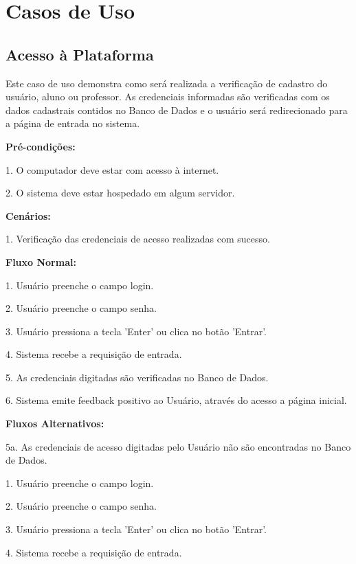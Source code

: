 \documentclass[graduacao,brazil]{ThesisPUC}
\begin{document}

\section{Casos de Uso}

\subsection{Acesso \`{a} Plataforma}

Este caso de uso demonstra como ser\'{a} realizada a verifica\c{c}\~{a}o de cadastro do usu\'{a}rio, aluno ou professor.
As credenciais informadas s\~{a}o verificadas com os dados cadastrais contidos no Banco de Dados e o usuário ser\'{a}
redirecionado para a p\'{a}gina de entrada no sistema.


\textbf{Pr\'{e}-condi\c{c}\~{o}es:}

1. O computador deve estar com acesso \`{a} internet.

2. O sistema deve estar hospedado em algum servidor.


\textbf{Cenários:}

1. Verifica\c{c}\~{a}o das credenciais de acesso realizadas com sucesso.


\textbf{Fluxo Normal:}

1. Usu\'{a}rio preenche o campo login.

2. Usu\'{a}rio preenche o campo senha.

3. Usu\'{a}rio pressiona a tecla 'Enter' ou clica no bot\~{a}o 'Entrar'.

4. Sistema recebe a requisi\c{c}\~{a}o de entrada.

5. As credenciais digitadas s\~{a}o verificadas no Banco de Dados.

6. Sistema emite feedback positivo ao Usu\'{a}rio, atrav\'{e}s do acesso a p\'{a}gina inicial.


\textbf{Fluxos Alternativos:}

5a. As credenciais de acesso digitadas pelo Usu\'{a}rio n\~{a}o s\~{a}o encontradas no Banco de Dados.

1. Usu\'{a}rio preenche o campo login.

2. Usu\'{a}rio preenche o campo senha.

3. Usu\'{a}rio pressiona a tecla 'Enter' ou clica no bot\~{a}o 'Entrar'.

4. Sistema recebe a requisi\c{c}\~{a}o de entrada.
\end{document}
